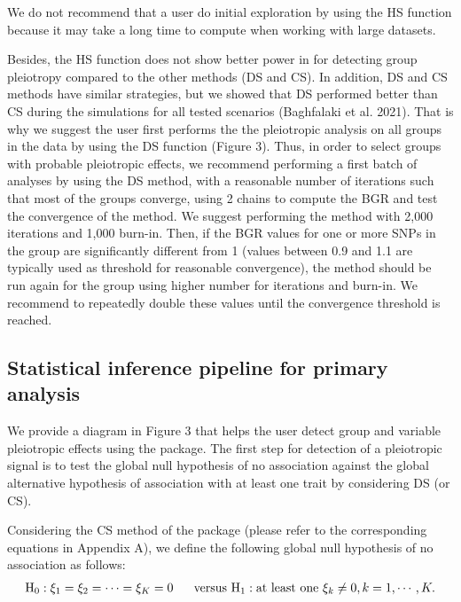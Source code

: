 We do not recommend that
a user do initial exploration by using the HS function because it may take a long time to compute when working with large datasets.

Besides, the HS function does not show better power in for detecting group pleiotropy compared to the other methods (DS and CS).
In addition, DS and CS methods have similar strategies, but we showed that DS performed better than CS during the simulations for all tested scenarios (Baghfalaki et al. 2021).
That is why we suggest the user first performs the
the pleiotropic analysis on all groups in the data by using the DS function (Figure 3).
Thus, in order to select groups with probable pleiotropic effects, we recommend performing a first batch of analyses by using the DS method, with a reasonable number of iterations
such that most of the groups converge, using 2 chains to compute the BGR and test the convergence of the method.
We suggest performing the method with 2,000 iterations and 1,000 burn-in.
Then, if the BGR values for one or more SNPs in the group are significantly different
from 1 (values between 0.9 and 1.1 are typically used as threshold for reasonable convergence),
the method should be run again for the group using higher number for iterations and burn-in.
We recommend to repeatedly double these values until the convergence threshold is reached.

\hypertarget{statistical-inference-pipeline-for-primary-analysis}{%
\subsection{Statistical inference pipeline for primary analysis}\label{statistical-inference-pipeline-for-primary-analysis}}

We provide a diagram in Figure 3 that helps the user detect group and variable pleiotropic effects using the  package.
The first step for detection of a pleiotropic signal is to test the global null hypothesis of no association against the global alternative hypothesis of association with at least one trait by considering DS (or CS).

Considering the CS method of the package (please refer to the corresponding equations in Appendix A), we define the following global null hypothesis of no association as follows:
\begin{eqnarray}\label{testC}
 {\rm{H}_0}:{\xi_1} = {\xi_2} = \cdots = {\xi_K} = 0{\rm{~~~~~  }} \textrm{versus }
{\rm{H}_1}:{\rm{at~ least~ one ~}}{{\xi}_k} \ne 0,k = 1,\cdots,K.
 \end{eqnarray}

